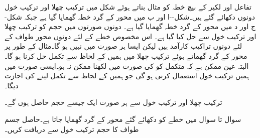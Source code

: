 \begin{figure}
\begin{subfigure}{0.45\textwidth}
\caption{}
\end{subfigure}
\caption{}
\label{شکل_تکمل_استعمال_چھلا_خول}
\end{figure}

تفاعل  اور لکیر  کے بیچ خطہ کو مثال بناتے ہوئے شکل  میں ترکیب چھلا اور ترکیب خول دونوں دکھائے گئے ہیں۔شکل--ا اور ب میں  محور کے گرد خطہ گھمایا گیا ہے جبکہ شکل-ج اور د میں  محور کے گرد خطہ گھمایا گیا ہے۔ دونوں صورتوں میں حجم کو ترکیب چھلا اور ترکیب خول سے حل کیا گیا ہے۔ اس مخصوص خطے کے لئے دونوں محور طواف کے لئے دونوں تراکیب کارآمد ہیں لیکن ایسا ہر صورت میں نہیں ہو گا۔مثال کے طور پر  محور کے گرد گھماتے ہوئے ترکیب چھلا میں ہمیں  کے لحاظ سے تکمل حل کرنا ہو گا۔البتہ عین ممکن ہے کہ متکمل کو  کی صورت میں لکھنا ممکن نہ ہو۔ایسی صورت میں ہمیں ترکیب خول استعمال کرنی ہو گی جو ہمیں  کے لحاظ سے تکمل لینے کی اجازت دیگا۔

ترکیب چھلا اور ترکیب خول سے ہر صورت ایک جیسے حجم حاصل ہوں گے۔

سوال  تا سوال  میں خطے کو دکھائے گئے محور کے گرد گھمایا جاتا ہے۔حاصل جسم طواف کا حجم ترکیب خول سے دریافت کریں۔

